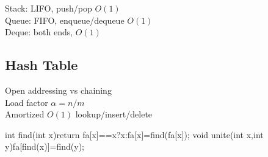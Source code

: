 \documentclass[lang=en,cols=4,paper=a4,fontsize=6.5pt,scheme=classic]{../cheatsheet}
\begin{document}
\begin{cmpbox}
Stack: LIFO, push/pop $O(1)$\\
Queue: FIFO, enqueue/dequeue $O(1)$\\
Deque: both ends, $O(1)$
\end{cmpbox}

\subsection{Hash Table}
Open addressing vs chaining\\
Load factor $\alpha = n/m$\\
Amortized $O(1)$ lookup/insert/delete

\begin{codebox}
int find(int x){return fa[x]==x?x:fa[x]=find(fa[x]);}
void unite(int x,int y){fa[find(x)]=find(y);}
\end{codebox}

\stopcols
\end{document}

